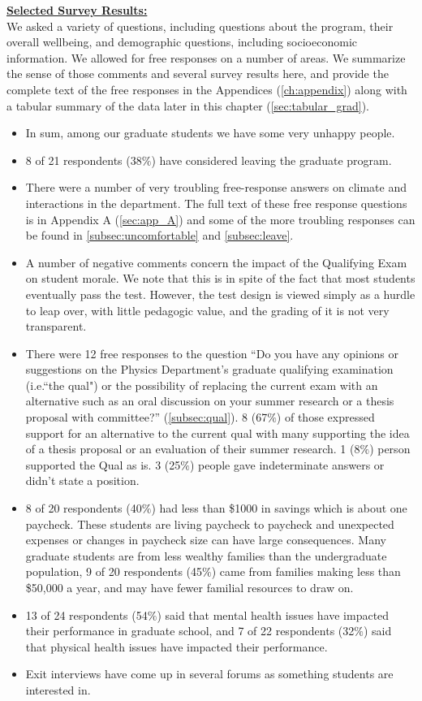 \documentclass[oneside]{book}   %
\begin{document}
\noindent\underline{\textbf{Selected Survey Results:}}\\

We asked a variety of questions, including questions about the program, their overall wellbeing, and demographic questions, including socioeconomic information. We allowed for free responses on a number of areas. We summarize the sense of those comments and several survey results here, and provide the complete text of the free responses in the Appendices (\cref{ch:appendix}) along with a tabular summary of the data later in this chapter (\cref{sec:tabular_grad}). 

\begin{itemize}
	\item In sum, among our graduate students we have some very unhappy people.
	\item 8 of 21 respondents (38$\%$) have considered leaving the graduate program.
	\item There were a number of very troubling free-response answers on climate and interactions in the department. The full text of these free response questions is in Appendix A (\cref{sec:app_A}) and some of the more troubling responses can be found in \cref{subsec:uncomfortable} and \cref{subsec:leave}.
	\item A number of negative comments concern the impact of the Qualifying Exam on student morale. We note that this is in spite of the fact that most students eventually pass the test. However, the test design is viewed simply as a hurdle to leap over, with little pedagogic value, and the grading of it is not very transparent. 
	\item There were 12 free responses to the question “Do you have any opinions or suggestions on the Physics Department's graduate qualifying examination (i.e.``the qual") or the possibility of replacing the current exam with an alternative such as an oral discussion on your summer research or a thesis proposal with committee?” (\cref{subsec:qual}). 8 (67$\%$) of those expressed support for an alternative to the current qual with many supporting the idea of a thesis proposal or an evaluation of their summer research. 1 (8$\%$) person supported the Qual as is. 3 (25$\%$) people gave indeterminate answers or didn’t state a position.
	\item 8 of 20 respondents (40$\%$) had less than \$1000 in savings which is about one paycheck. These students are living paycheck to paycheck and unexpected expenses or changes in paycheck size can have large consequences. Many graduate students are from less wealthy families than the undergraduate population, 9 of 20 respondents (45$\%$) came from families making less than \$50,000 a year, and may have fewer familial resources to draw on.
	\item 13 of 24 respondents (54$\%$) said that mental health issues have impacted their performance in graduate school, and 7 of 22 respondents (32$\%$) said that physical health issues have impacted their performance.
	\item Exit interviews have come up in several forums as something students are interested in.
\end{itemize}
\end{document}
